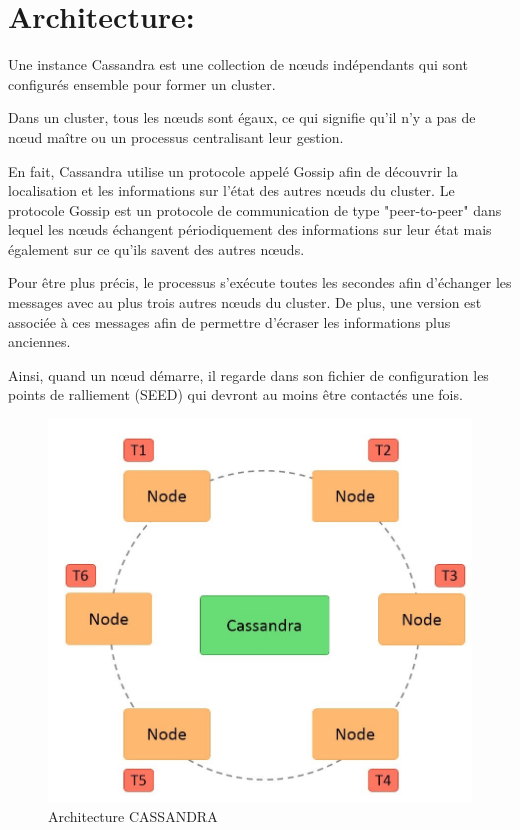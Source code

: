 \section{Architecture:}
Une instance Cassandra est une collection de nœuds indépendants qui sont configurés ensemble pour former un cluster.

Dans un cluster, tous les nœuds sont égaux, ce qui signifie qu'il n'y a pas de nœud maître ou un processus centralisant leur gestion.

En fait, Cassandra utilise un protocole appelé Gossip afin de découvrir la localisation et les informations sur l'état des autres nœuds du cluster. Le protocole Gossip est un protocole de communication de type "peer-to-peer" dans lequel les nœuds échangent périodiquement des informations sur leur état mais également sur ce qu'ils savent des autres nœuds.

Pour être plus précis, le processus s'exécute toutes les secondes afin d'échanger les messages avec au plus trois autres nœuds du cluster. De plus, une version est associée à ces messages afin de permettre d'écraser les informations plus anciennes.

Ainsi, quand un nœud démarre, il regarde dans son fichier de configuration les points de ralliement (SEED) qui devront au moins être contactés une fois.

\begin{figure}[h]
	\centering
    \includegraphics[scale=0.2]{img/part1/5.2}
    \caption{Architecture CASSANDRA}
\end{figure}

